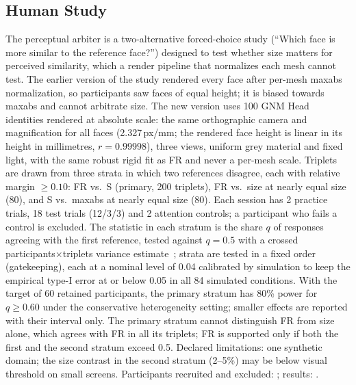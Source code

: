 \subsection{Human Study}
\label{sec:protocol_human}

The perceptual arbiter is a two-alternative forced-choice study (``Which face
is more similar to the reference face?'') designed to test whether size
matters for perceived similarity, which a render pipeline that normalizes each
mesh cannot test. The earlier version of the study rendered every face after
per-mesh maxabs normalization, so participants saw faces of equal height; it
is biased towards maxabs and cannot arbitrate size.
The new version uses 100 GNM Head identities rendered at absolute scale: the
same orthographic camera and magnification for all faces (2.327\,px/mm; the
rendered face height is linear in its height in millimetres, $r=0.99998$),
three views, uniform grey material and fixed light, with the same robust rigid
fit as FR and never a per-mesh scale.
Triplets are drawn from three strata in which two references disagree, each
with relative margin $\ge0.10$: FR vs.\ S (primary, 200 triplets), FR vs.\
size at nearly equal size (80), and S vs.\ maxabs at nearly equal size (80).
Each session has 2 practice trials, 18 test trials (12/3/3) and 2 attention
controls; a participant who fails a control is excluded.
The statistic in each stratum is the share $q$ of responses agreeing with the
first reference, tested against $q=0.5$ with a crossed participants$\times$triplets
variance estimate~\cite{owen2007pigeonhole}; strata are tested in a fixed
order (gatekeeping), each at a nominal level of 0.04 calibrated by simulation
to keep the empirical type-I error at or below 0.05 in all 84 simulated
conditions.
With the target of 60 retained participants, the primary stratum has 80\%
power for $q\ge0.60$ under the conservative heterogeneity setting; smaller
effects are reported with their interval only.
The primary stratum cannot distinguish FR from size alone, which agrees with
FR in all its triplets; FR is supported only if both the first and the second
stratum exceed 0.5.
Declared limitations: one synthetic domain; the size contrast in the second
stratum (2--5\%) may be below visual threshold on small screens.
Participants recruited and excluded: \todo{N tenuti / N esclusi}; results:
\todo{q con IC per i tre strati}.
